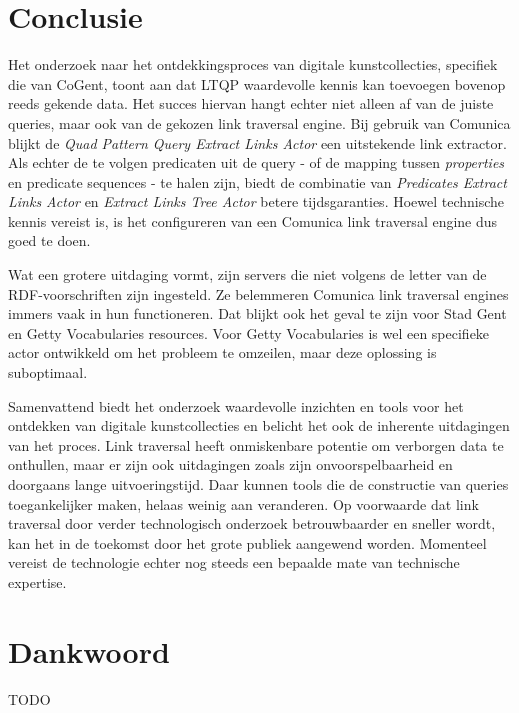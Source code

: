 \documentclass[conference]{IEEEtran}
\begin{document}
\section*{Conclusie}
Het onderzoek naar het ontdekkingsproces van digitale kunstcollecties, specifiek die van CoGent, toont aan dat LTQP waardevolle kennis kan toevoegen bovenop reeds gekende data. Het succes hiervan hangt echter niet alleen af van de juiste queries, maar ook van de gekozen link traversal engine. Bij gebruik van Comunica blijkt de \textit{Quad Pattern Query Extract Links Actor} een uitstekende link extractor. Als echter de te volgen predicaten uit de query - of de mapping tussen \textit{properties} en predicate sequences - te halen zijn, biedt de combinatie van \textit{Predicates Extract Links Actor} en \textit{Extract Links Tree Actor} betere tijdsgaranties. Hoewel technische kennis vereist is, is het configureren van een Comunica link traversal engine dus goed te doen.

Wat een grotere uitdaging vormt, zijn servers die niet volgens de letter van de RDF-voorschriften zijn ingesteld. Ze belemmeren Comunica link traversal engines immers vaak in hun functioneren. Dat blijkt ook het geval te zijn voor Stad Gent en Getty Vocabularies resources. Voor Getty Vocabularies is wel een specifieke actor ontwikkeld om het probleem te omzeilen, maar deze oplossing is suboptimaal.

Samenvattend biedt het onderzoek waardevolle inzichten en tools voor het ontdekken van digitale kunstcollecties en belicht het ook de inherente uitdagingen van het proces. Link traversal heeft onmiskenbare potentie om verborgen data te onthullen, maar er zijn ook uitdagingen zoals zijn onvoorspelbaarheid en doorgaans lange uitvoeringstijd. Daar kunnen tools die de constructie van queries toegankelijker maken, helaas weinig aan veranderen. Op voorwaarde dat link traversal door verder technologisch onderzoek betrouwbaarder en sneller wordt, kan het in de toekomst door het grote publiek aangewend worden. Momenteel vereist de technologie echter nog steeds een bepaalde mate van technische expertise.

\section*{Dankwoord}
TODO



\end{document}
